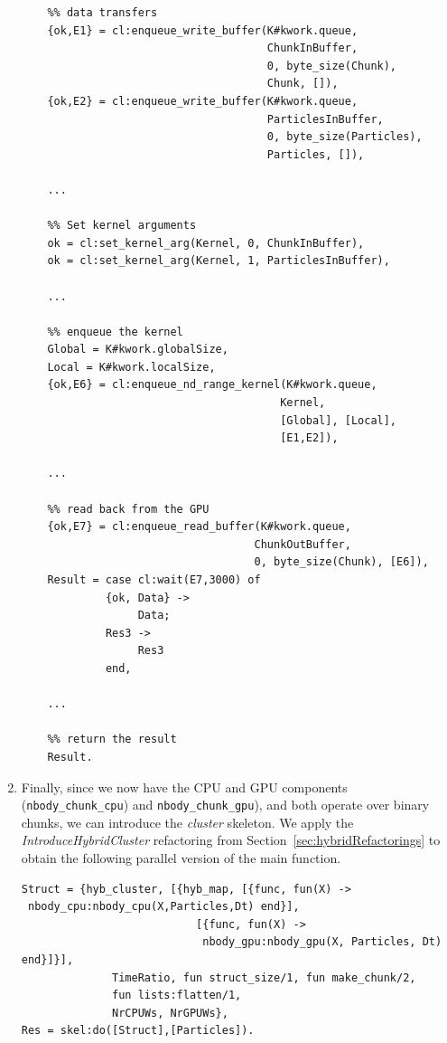 \documentclass[final]{jfp1}
\makeatletter
\def\thickhrulefill{\leavevmode \leaders \hrule height 0.5pt \hfill \kern \z@}
\newcommand{\hrules}{\vspace{1.5ex}\thickhrulefill}
\newcommand{\hrulee}{\thickhrulefill\vspace{1.5ex}}
\makeatother
\begin{document}
\begin{enumerate}
\begin{lstlisting}
    %% data transfers
    {ok,E1} = cl:enqueue_write_buffer(K#kwork.queue,
                                      ChunkInBuffer,
                                      0, byte_size(Chunk),
                                      Chunk, []),
    {ok,E2} = cl:enqueue_write_buffer(K#kwork.queue,
                                      ParticlesInBuffer,
                                      0, byte_size(Particles),
                                      Particles, []),

    ...
                                   
    %% Set kernel arguments
    ok = cl:set_kernel_arg(Kernel, 0, ChunkInBuffer),
    ok = cl:set_kernel_arg(Kernel, 1, ParticlesInBuffer),
    
    ...

    %% enqueue the kernel
    Global = K#kwork.globalSize,
    Local = K#kwork.localSize,
    {ok,E6} = cl:enqueue_nd_range_kernel(K#kwork.queue,
                                        Kernel,
                                        [Global], [Local],
                                        [E1,E2]),

    ...

    %% read back from the GPU
    {ok,E7} = cl:enqueue_read_buffer(K#kwork.queue,
                                    ChunkOutBuffer,
                                    0, byte_size(Chunk), [E6]),
    Result = case cl:wait(E7,3000) of
             {ok, Data} ->
                  Data;
             Res3 ->
                  Res3
             end,

    ...

    %% return the result
    Result.
\end{lstlisting}

\item Finally, since we now have the CPU and GPU components
  (\lstinline{nbody_chunk_cpu}) and \lstinline{nbody_chunk_gpu}),
  and both 
  operate over binary chunks, we can introduce the \emph{cluster} skeleton. We apply the \emph{IntroduceHybridCluster} refactoring
  from Section~\ref{sec:hybridRefactorings} to obtain the following parallel version of the
  main function. %

\begin{lstlisting}
Struct = {hyb_cluster, [{hyb_map, [{func, fun(X) ->
 nbody_cpu:nbody_cpu(X,Particles,Dt) end}], 
                           [{func, fun(X) ->
                            nbody_gpu:nbody_gpu(X, Particles, Dt) end}]}],
              TimeRatio, fun struct_size/1, fun make_chunk/2, 
              fun lists:flatten/1,
              NrCPUWs, NrGPUWs},
Res = skel:do([Struct],[Particles]).
\end{lstlisting}


\end{enumerate}
\end{document}
